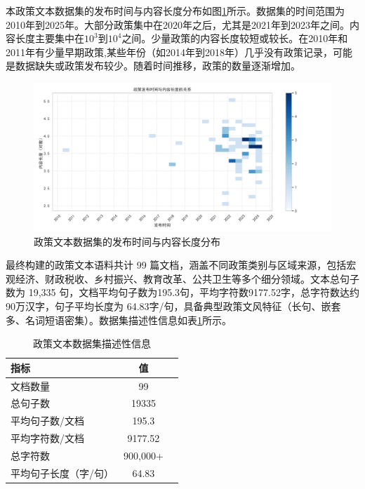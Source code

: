 \documentclass[12pt, a4paper]{ctexart}
\begin{document}
本政策文本数据集的发布时间与内容长度分布如图\ref{fig:policy_pubtime_log_content_length}所示。数据集的时间范围为2010年到2025年。大部分政策集中在2020年之后，尤其是2021年到2023年之间。内容长度主要集中在$10^3$到$10^4$之间。少量政策的内容长度较短或较长。在2010年和2011年有少量早期政策,某些年份（如2014年到2018年）几乎没有政策记录，可能是数据缺失或政策发布较少。随着时间推移，政策的数量逐渐增加。

\begin{figure}[H]
    \centering
    \includegraphics[width=1\textwidth]{images/policy_pubtime_log_content_length.png}
    \caption{政策文本数据集的发布时间与内容长度分布}
    \label{fig:policy_pubtime_log_content_length}
\end{figure}


最终构建的政策文本语料共计 99 篇文档，涵盖不同政策类别与区域来源，包括宏观经济、财政税收、乡村振兴、教育改革、公共卫生等多个细分领域。文本总句子数为 19,335 句，文档平均句子数为195.3句，平均字符数9177.52字，总字符数达约90万汉字，句子平均长度为 64.83字/句，具备典型政策文风特征（长句、嵌套多、名词短语密集）。数据集描述性信息如表\ref{tab:policy_dataset_description}所示。

\begin{table}[H]
    \renewcommand{\arraystretch}{1}
    \centering
    \caption{政策文本数据集描述性信息}
    \label{tab:policy_dataset_description}
    \begin{tabular}{lcc}
        \toprule
        \textbf{指标} & \textbf{值} \\ 
        \midrule
        文档数量 & 99 \\
        总句子数 & 19335 \\
        平均句子数/文档 & 195.3 \\
        平均字符数/文档 & 9177.52 \\ 
        总字符数 & 900,000+ \\ 
        平均句子长度（字/句） & 64.83 \\
        \bottomrule
    \end{tabular}
\end{table}
\end{document}
